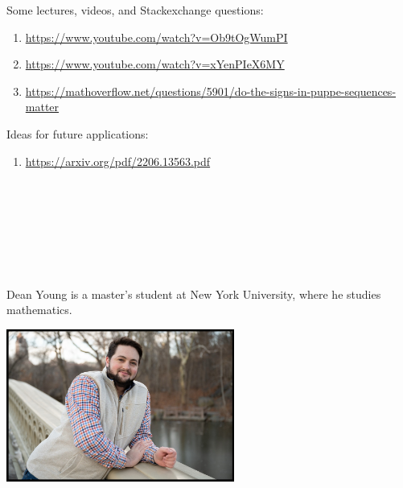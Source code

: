 \documentclass{book}
\theoremstyle{definition}
\newcounter{lcounter}
\begin{document}
Some lectures, videos, and Stackexchange questions:

\begin{enumerate}
\item \url{https://www.youtube.com/watch?v=Ob9tOgWumPI}
\item \url{https://www.youtube.com/watch?v=xYenPIeX6MY}
\item \url{https://mathoverflow.net/questions/5901/do-the-signs-in-puppe-sequences-matter}
\end{enumerate}

Ideas for future applications:

\begin{enumerate}
\item \url{https://arxiv.org/pdf/2206.13563.pdf}
\end{enumerate}

\newpage 
\ \\
\ \\
\ \\
\ \\
\ \\
\ \\
\begin{center}
\begin{tcolorbox}[width=5in,colback={white},title={\begin{center}\texttt{About the Author} \addtocounter{lcounter}{1}  \end{center}},colbacktitle=Yellow,coltitle=black]
Dean Young is a master's student at New York University, where he studies mathematics. \\
\begin{center}
\includegraphics[width=7.5cm,height=5cm]{about.jpg}
\end{center}
\end{tcolorbox}
\end{center}
\end{document}
